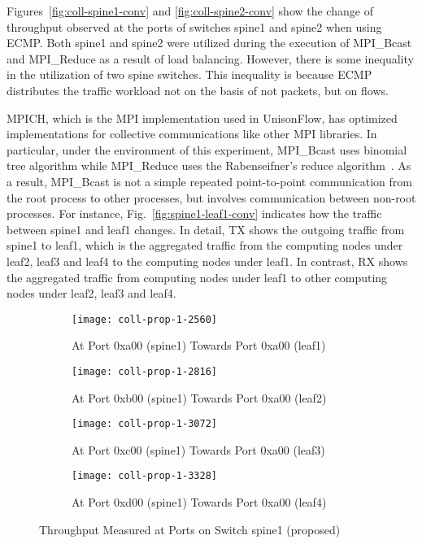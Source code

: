 Figures~\ref{fig:coll-spine1-conv} and \ref{fig:coll-spine2-conv} show
the change of throughput observed at the ports of switches spine1 and
spine2 when using ECMP\@. Both spine1 and spine2 were utilized during the
execution of MPI\_Bcast and MPI\_Reduce as a result of load balancing.
However, there is some inequality in the utilization of two spine
switches. This inequality is because ECMP distributes the traffic
workload not on the basis of not packets, but on flows.

MPICH, which is the MPI implementation used in UnisonFlow, has optimized
implementations for collective communications like other MPI libraries.
In particular, under the environment of this experiment, MPI\_Bcast uses
binomial tree algorithm while MPI\_Reduce uses the Rabenseifner's reduce
algorithm~\autocite{Rabenseifner2004}. As a result, MPI\_Bcast is not a
simple repeated point-to-point communication from the root process to
other processes, but involves communication between non-root processes.
For instance, Fig.~\ref{fig:spine1-leaf1-conv} indicates how the traffic
between spine1 and leaf1 changes. In detail, TX shows the outgoing
traffic from spine1 to leaf1, which is the aggregated traffic from the
computing nodes under leaf2, leaf3 and leaf4 to the computing nodes
under leaf1. In contrast, RX shows the aggregated traffic from computing
nodes under leaf1 to other computing nodes under leaf2, leaf3 and leaf4.

\begin{figure}
    \centering
    \begin{subfigure}{.45\linewidth}
        \texttt{[image: coll-prop-1-2560]}
        \caption{At Port 0xa00 (spine1) \newline Towards Port 0xa00 (leaf1)}%
        \label{fig:spine1-leaf1-prop}
    \end{subfigure}
    \begin{subfigure}{.45\linewidth}
        \texttt{[image: coll-prop-1-2816]}
        \caption{At Port 0xb00 (spine1) \newline Towards Port 0xa00 (leaf2)}%
        \label{fig:spine1-leaf2-prop}
    \end{subfigure}
    \begin{subfigure}{.45\linewidth}
        \texttt{[image: coll-prop-1-3072]}
        \caption{At Port 0xc00 (spine1) \newline Towards Port 0xa00 (leaf3)}%
        \label{fig:spine1-leaf3-prop}
    \end{subfigure}
    \begin{subfigure}{.45\linewidth}
        \texttt{[image: coll-prop-1-3328]}
        \caption{At Port 0xd00 (spine1) \newline Towards Port 0xa00 (leaf4)}%
        \label{fig:spine1-leaf4-prop}
    \end{subfigure}
    \caption{Throughput Measured at Ports on Switch spine1 (proposed)}%
    \label{fig:coll-spine1-prop}
\end{figure}

